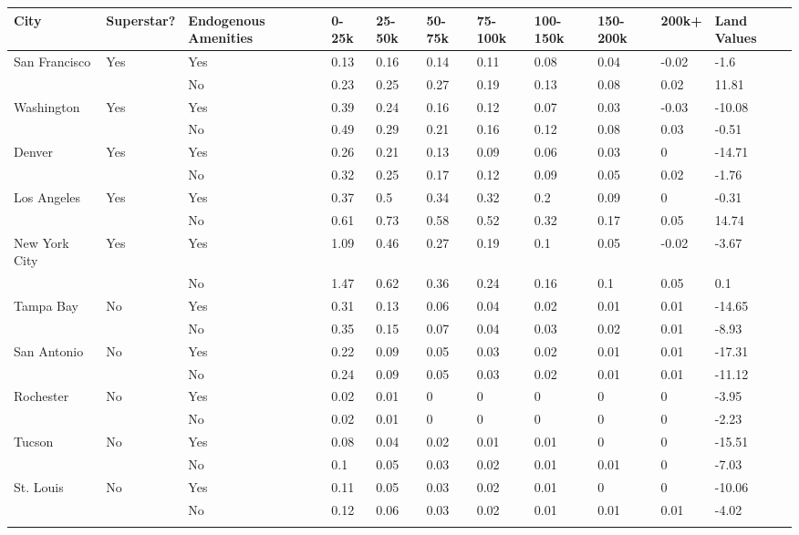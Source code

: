  \centering \renewcommand*{\arraystretch}{1.4}
\begin{tabular}{lllllllllll}
\hline
\hline
City & Superstar? & Endogenous Amenities & 0-25k & 25-50k & 50-75k & 75-100k & 100-150k & 150-200k & 200k+ & Land Values \\ 
\hline
San Francisco & Yes & Yes & 0.13 & 0.16 & 0.14 & 0.11 & 0.08 & 0.04 & -0.02 & -1.6 \\ 
 &  & No & 0.23 & 0.25 & 0.27 & 0.19 & 0.13 & 0.08 & 0.02 & 11.81 \\ 
Washington & Yes & Yes & 0.39 & 0.24 & 0.16 & 0.12 & 0.07 & 0.03 & -0.03 & -10.08 \\ 
 &  & No & 0.49 & 0.29 & 0.21 & 0.16 & 0.12 & 0.08 & 0.03 & -0.51 \\ 
Denver & Yes & Yes & 0.26 & 0.21 & 0.13 & 0.09 & 0.06 & 0.03 & 0 & -14.71 \\ 
 &  & No & 0.32 & 0.25 & 0.17 & 0.12 & 0.09 & 0.05 & 0.02 & -1.76 \\ 
Los Angeles & Yes & Yes & 0.37 & 0.5 & 0.34 & 0.32 & 0.2 & 0.09 & 0 & -0.31 \\ 
 &  & No & 0.61 & 0.73 & 0.58 & 0.52 & 0.32 & 0.17 & 0.05 & 14.74 \\ 
New York City & Yes & Yes & 1.09 & 0.46 & 0.27 & 0.19 & 0.1 & 0.05 & -0.02 & -3.67 \\ 
 &  & No & 1.47 & 0.62 & 0.36 & 0.24 & 0.16 & 0.1 & 0.05 & 0.1 \\ 
Tampa Bay & No & Yes & 0.31 & 0.13 & 0.06 & 0.04 & 0.02 & 0.01 & 0.01 & -14.65 \\ 
 &  & No & 0.35 & 0.15 & 0.07 & 0.04 & 0.03 & 0.02 & 0.01 & -8.93 \\ 
San Antonio & No & Yes & 0.22 & 0.09 & 0.05 & 0.03 & 0.02 & 0.01 & 0.01 & -17.31 \\ 
 &  & No & 0.24 & 0.09 & 0.05 & 0.03 & 0.02 & 0.01 & 0.01 & -11.12 \\ 
Rochester & No & Yes & 0.02 & 0.01 & 0 & 0 & 0 & 0 & 0 & -3.95 \\ 
 &  & No & 0.02 & 0.01 & 0 & 0 & 0 & 0 & 0 & -2.23 \\ 
Tucson & No & Yes & 0.08 & 0.04 & 0.02 & 0.01 & 0.01 & 0 & 0 & -15.51 \\ 
 &  & No & 0.1 & 0.05 & 0.03 & 0.02 & 0.01 & 0.01 & 0 & -7.03 \\ 
St. Louis & No & Yes & 0.11 & 0.05 & 0.03 & 0.02 & 0.01 & 0 & 0 & -10.06 \\ 
 &  & No & 0.12 & 0.06 & 0.03 & 0.02 & 0.01 & 0.01 & 0.01 & -4.02\\ 
\hline
\hline
\multicolumn{11}{l}{}\\ 
\end{tabular}


